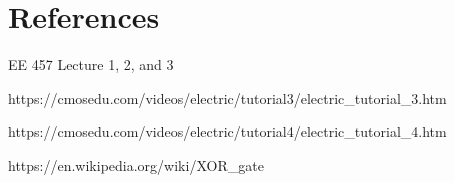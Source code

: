 \documentclass{article}
\begin{document}
\newpage
\section{References}

\noindent [\text{1}] EE 457 Lecture 1, 2, and 3

\noindent [\text{2}] https://cmosedu.com/videos/electric/tutorial3/electric\_tutorial\_3.htm 

\noindent [\text{3}] https://cmosedu.com/videos/electric/tutorial4/electric\_tutorial\_4.htm 

\noindent [\text{4}] https://en.wikipedia.org/wiki/XOR\_gate 

\end{document}
